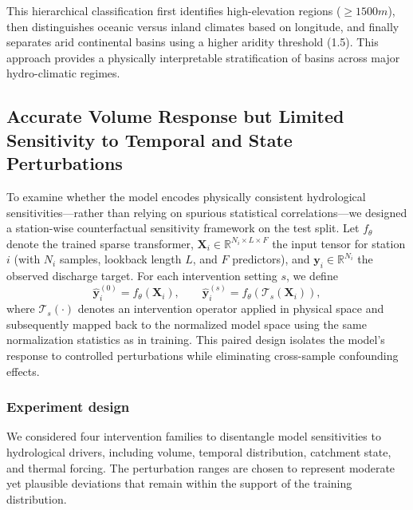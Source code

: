 \documentclass[11pt]{article}
\begin{document}
This hierarchical classification first identifies high-elevation regions ($\geq 1500 m$), then distinguishes oceanic versus inland climates based on longitude, and finally separates arid continental basins using a higher aridity threshold (1.5). This approach provides a physically interpretable stratification of basins across major hydro-climatic regimes.

\subsection{Accurate Volume Response but Limited Sensitivity to Temporal and State Perturbations}
\label{sec:sensitive}

To examine whether the model encodes physically consistent hydrological sensitivities—rather than relying on spurious statistical correlations—we designed a station-wise counterfactual sensitivity framework on the test split\cite{simic2025perturbation}. Let $f_{\theta}$ denote the trained sparse transformer, $\mathbf{X}_{i}\in\mathbb{R}^{N_i\times L\times F}$ the input tensor for station $i$ (with $N_i$ samples, lookback length $L$, and $F$ predictors), and $\mathbf{y}_{i}\in\mathbb{R}^{N_i}$ the observed discharge target. For each intervention setting $s$, we define
\begin{equation}
    \hat{\mathbf{y}}_{i}^{(0)} = f_{\theta}(\mathbf{X}_{i}),
    \qquad
    \hat{\mathbf{y}}_{i}^{(s)} = f_{\theta}(\mathcal{T}_{s}(\mathbf{X}_{i})),
\end{equation}
where $\mathcal{T}_{s}(\cdot)$ denotes an intervention operator applied in physical space and subsequently mapped back to the normalized model space using the same normalization statistics as in training\cite{read2019process}. This paired design isolates the model’s response to controlled perturbations while eliminating cross-sample confounding effects\cite{10.2166/wcc.2017.149}.

\subsubsection*{Experiment design}

We considered four intervention families to disentangle model sensitivities to hydrological drivers, including volume, temporal distribution, catchment state, and thermal forcing\cite{hess-30-1077-2026}. The perturbation ranges are chosen to represent moderate yet plausible deviations that remain within the support of the training distribution.
\end{document}
